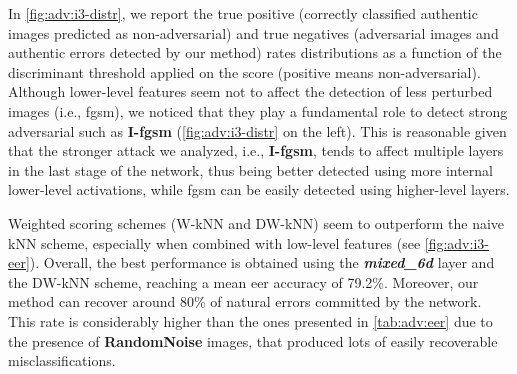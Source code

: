 In \ref{fig:adv:i3-distr}, we report the true positive (correctly classified authentic images predicted as non-adversarial) and true negatives (adversarial images and authentic errors detected by our method) rates distributions as a function of the discriminant threshold applied on the score (positive means non-adversarial).
Although lower-level features seem not to affect the detection of less perturbed images (i.e., \gls{fgsm}), we noticed that they play a fundamental role to detect strong adversarial such as \textbf{I-\gls{fgsm}} (\ref{fig:adv:i3-distr} on the left).
This is reasonable given that the stronger attack we analyzed, i.e., \textbf{I-\gls{fgsm}}, tends to affect multiple layers in the last stage of the network, thus being better detected using more internal lower-level activations, while \gls{fgsm} can be easily detected using higher-level layers.

Weighted scoring schemes (W-kNN and DW-kNN) seem to outperform the naive kNN scheme, especially when combined with low-level features (see \ref{fig:adv:i3-eer}).
Overall, the best performance is obtained using the \textbf{\emph{mixed\_6d}} layer and the DW-kNN scheme, reaching a mean \gls{eer} accuracy of 79.2\%.
Moreover, our method can recover around 80\% of natural errors committed by the network. This rate is considerably higher than the ones presented in \ref{tab:adv:eer} due to the presence of \textbf{RandomNoise} images, that produced lots of easily recoverable misclassifications.

